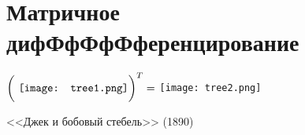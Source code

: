 
\section{Матричное дифФфФфФференцирование}


\epigraph{ $\bigg(\text{ \texttt{[image: tree1.png]}} \bigg)^T = $  \texttt{[image: tree2.png]} }{<<Джек и бобовый стебель>> (1890)}

